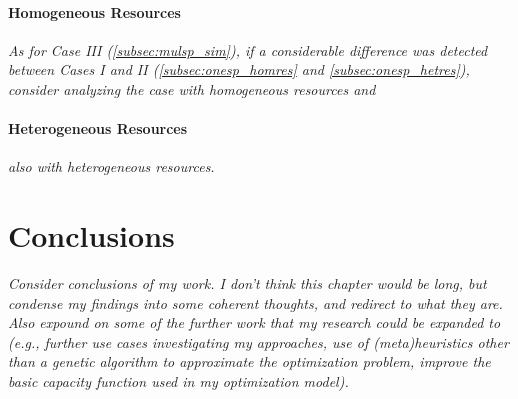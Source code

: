 \documentclass[12pt,dvipsnames]{report}
\begin{document}
\subsubsection{Homogeneous Resources} \label{subsubsec:mulsp_spec_homres}

\textit{As for Case III (\ref{subsec:mulsp_sim}), if a considerable difference was detected between Cases I and II (\ref{subsec:onesp_homres} and \ref{subsec:onesp_hetres}), consider analyzing the case with homogeneous resources and}

\subsubsection{Heterogeneous Resources} \label{subsubsec:mulsp_spec_hetres}

\textit{also with heterogeneous resources.}
\fi

\iftrue
\pagebreak
\chapter{Conclusions} \label{ch:conc}

%
\textit{Consider conclusions of my work.  I don't think this chapter would be long, but condense my findings into some coherent thoughts, and redirect to what they are.  Also expound on some of the further work that my research could be expanded to (e.g., further use cases investigating my approaches, use of (meta)heuristics other than a genetic algorithm to approximate the optimization problem, improve the basic capacity function used in my optimization model).}
\fi



\end{document}

